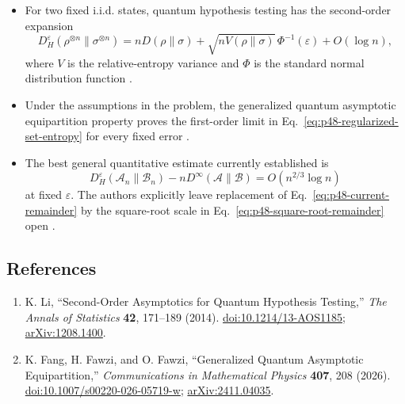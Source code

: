 \begin{itemize}
  \item For two fixed i.i.d. states, quantum hypothesis testing has the
  second-order expansion
  \begin{equation}
    D_H^\varepsilon(\rho^{\otimes n}\|\sigma^{\otimes n})
    =nD(\rho\|\sigma)
     +\sqrt{nV(\rho\|\sigma)}\,\Phi^{-1}(\varepsilon)+O(\log n),
    \label{eq:p48-iid-second-order}
  \end{equation}
  where $V$ is the relative-entropy variance and $\Phi$ is the standard
  normal distribution function
  .

  \item Under the assumptions in the problem, the generalized quantum
  asymptotic equipartition property proves the first-order limit in
  Eq.~\eqref{eq:p48-regularized-set-entropy} for every fixed error
  .

  \item The best general quantitative estimate currently established is
  \begin{equation}
    D_H^\varepsilon(\mathcal A_n\|\mathcal B_n)
    -nD^\infty(\mathcal A\|\mathcal B)
    =O(n^{2/3}\log n)
    \label{eq:p48-current-remainder}
  \end{equation}
  at fixed $\varepsilon$.  The authors explicitly leave replacement of
  Eq.~\eqref{eq:p48-current-remainder} by the square-root scale in
  Eq.~\eqref{eq:p48-square-root-remainder} open
  .
\end{itemize}

\subsection*{References}

\begin{enumerate}[label={},leftmargin=4.8em,labelsep=0.5em]
  \footnotesize
  \item[\textup{[Li14]}]\label{ref:p48-li}
  K. Li, ``Second-Order Asymptotics for Quantum Hypothesis Testing,''
  \emph{The Annals of Statistics} \textbf{42}, 171--189 (2014).
  \href{https://doi.org/10.1214/13-AOS1185}{doi:10.1214/13-AOS1185};
  \href{https://arxiv.org/abs/1208.1400}{arXiv:1208.1400}.

  \item[\textup{[FFF26]}]\label{ref:p48-fang-fawzi-fawzi}
  K. Fang, H. Fawzi, and O. Fawzi,
  ``Generalized Quantum Asymptotic Equipartition,''
  \emph{Communications in Mathematical Physics} \textbf{407}, 208 (2026).
  \href{https://doi.org/10.1007/s00220-026-05719-w}%
       {doi:10.1007/s00220-026-05719-w};
  \href{https://arxiv.org/abs/2411.04035}{arXiv:2411.04035}.
\end{enumerate}

